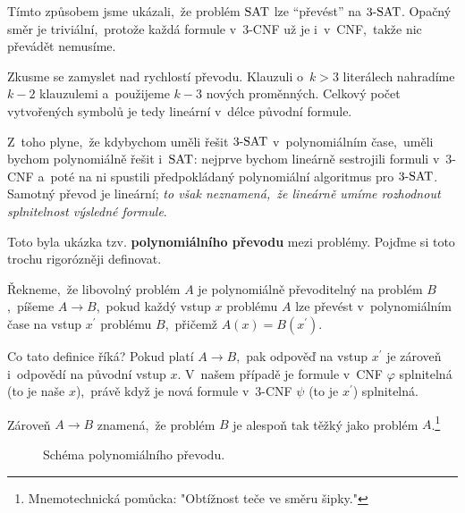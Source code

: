 Tímto způsobem jsme ukázali,~že problém \ensuremath{\SAT} lze ``převést'' na \ensuremath{\THREESAT}. Opačný směr je triviální,~protože každá formule v~$3$-CNF už je i~v~CNF,~takže nic převádět nemusíme.

Zkusme se zamyslet nad rychlostí převodu. Klauzuli o~$k>3$ literálech nahradíme $k-2$ klauzulemi a~použijeme $k-3$ nových proměnných. Celkový počet vytvořených symbolů je tedy lineární v~délce původní formule.

Z~toho plyne,~že kdybychom uměli řešit \ensuremath{\THREESAT} v~polynomiálním čase,~uměli bychom polynomiálně řešit i~\ensuremath{\SAT}: nejprve bychom lineárně sestrojili formuli v~3-CNF a~poté na ni spustili předpokládaný polynomiální algoritmus pro \ensuremath{\THREESAT}. Samotný převod je lineární; \emph{to však neznamená,~že lineárně umíme rozhodnout splnitelnost výsledné formule}.

Toto byla ukázka tzv. \textbf{polynomiálního převodu} mezi problémy. Pojďme si toto trochu rigorózněji definovat.
\begin{definition}\label{def:pol_prev}
    Řekneme,~že libovolný problém $A$ je polynomiálně převoditelný na problém $B$,~píšeme $A\rightarrow B$,~pokud každý vstup $x$ problému $A$ lze převést v~polynomiálním čase na vstup $x^\prime$ problému $B$,~přičemž $A(x)=B(x^\prime)$.
\end{definition}
Co tato definice říká? Pokud platí $A\rightarrow B$,~pak odpověď na vstup $x^\prime$ je zároveň i~odpovědí na původní vstup $x$. V~našem případě je formule v~CNF $\varphi$ splnitelná (to je naše $x$),~právě když je nová formule v~3-CNF $\psi$ (to je $x^\prime$) splnitelná.

Zároveň $A\rightarrow B$ znamená,~že problém $B$ je alespoň tak těžký jako problém $A$.\footnote{Mnemotechnická pomůcka: "Obtížnost teče ve směru šipky."}
\begin{figure}[ht]
    \centering
    
    \caption{Schéma polynomiálního převodu.}
    \label{fig:pol_prevod}
\end{figure}
